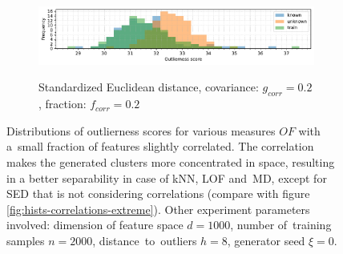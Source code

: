 \begin{figure}[t]
\begin{subfigure}[b]{\textwidth}
        \centering
        \caption{\small Standardized Euclidean distance, covariance: $g_{corr} = 0.2$, fraction: $f_{corr} = 0.2$}
        \includegraphics[width=\textwidth]{images/correlations/hists/hist-correlations-n_correlated_0.20-covariance_0.20-distance_8-outliers_correlated_False-model_SED-seed_0.pdf}
        \label{fig:hists-correlations-sed}
    \end{subfigure}
    \caption{Distributions of outlierness scores for various measures $OF$ with a~small fraction of features slightly correlated. The correlation makes the generated clusters more concentrated in space, resulting in a better separability in case of kNN, LOF and~MD, except for SED that is not considering correlations (compare with figure \ref{fig:hists-correlations-extreme}). Other experiment parameters involved: dimension of feature space $d = 1000$, number of~training samples $n = 2000$, distance~to~outliers $h = 8$, generator seed $\xi = 0$.}
    \label{fig:hists-correlations}
\end{figure}

